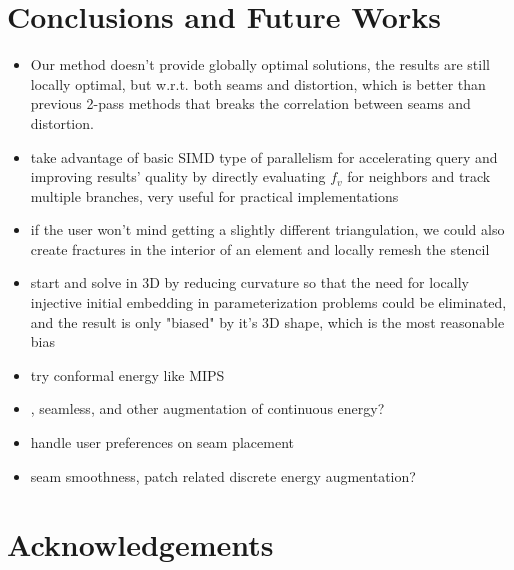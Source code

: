 \section{Conclusions and Future Works}
\label{sec:conclusion}

\begin{itemize}
\item Our method doesn't provide globally optimal solutions, the results are still locally optimal, but w.r.t. both seams and distortion, which is better than previous 2-pass methods that breaks the correlation between seams and distortion.
\item take advantage of basic SIMD type of parallelism for accelerating query and improving results' quality by directly evaluating $f_v$ for neighbors and track multiple branches, very useful for practical implementations
\item if the user won't mind getting a slightly different triangulation, we could also create fractures in the interior of an element and locally remesh the stencil
\item start and solve in 3D by reducing curvature so that the need for locally injective initial embedding in parameterization problems could be eliminated, and the result is only "biased" by it's 3D shape, which is the most reasonable bias
\item try conformal energy like MIPS
\item {}, seamless, and other augmentation of continuous energy?
\item handle user preferences on seam placement
\item seam smoothness, patch related discrete energy augmentation?
\end{itemize}

\section{Acknowledgements}